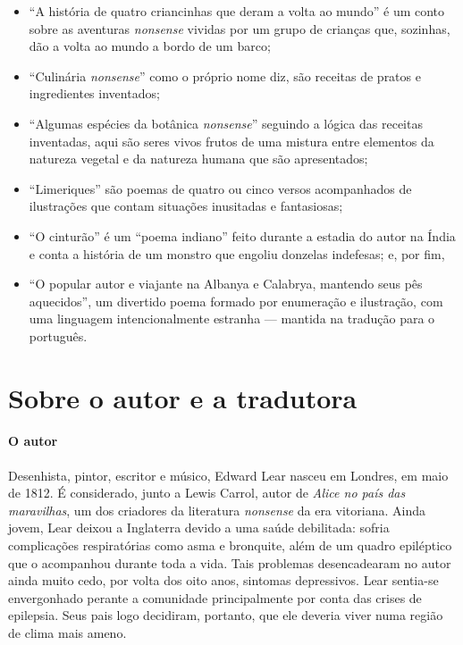 \documentclass[11pt]{extarticle}
\begin{document}
\begin{itemize}
\item {``A história de quatro criancinhas que deram a volta ao mundo''} é
um conto sobre as aventuras \emph{nonsense} vividas por um grupo de crianças
que, sozinhas, dão a volta ao mundo a bordo de um barco;
\item {``Culinária \emph{nonsense}''} como o próprio nome diz, 
são receitas de pratos e ingredientes inventados; 
\item {``Algumas espécies da botânica \emph{nonsense}''} seguindo a lógica das receitas inventadas,
aqui são seres vivos frutos de uma mistura entre elementos da natureza vegetal e da natureza
humana que são apresentados; 
\item {``Limeriques''} são poemas de quatro ou cinco versos acompanhados de ilustrações que contam
situações inusitadas e fantasiosas; 
\item {``O cinturão''} é um ``poema indiano'' feito durante a estadia do autor na Índia e conta a história de um 
monstro que engoliu donzelas indefesas; e, por fim,
\item {``O popular autor e viajante na Albanya e Calabrya, mantendo seus pês aquecidos''},
um divertido poema formado por enumeração e ilustração, com uma linguagem intencionalmente
estranha --- mantida na tradução para o português.
\end{itemize}


\reversemarginpar
\marginparwidth=5cm



\section{Sobre o autor e a tradutora}


\paragraph{O autor} Desenhista, pintor, escritor e músico, Edward Lear nasceu em Londres, em
maio de 1812. É considerado, junto a Lewis Carrol, autor de \textit{Alice no país das maravilhas},
um dos criadores da literatura \textit{nonsense} da era vitoriana.
Ainda jovem, Lear deixou a Inglaterra devido a uma saúde debilitada:
sofria complicações respiratórias como asma e bronquite, além
de um quadro epiléptico que o acompanhou durante toda a vida.
Tais problemas desencadearam no autor ainda muito cedo,
por volta dos oito anos, sintomas depressivos. Lear sentia-se 
envergonhado perante a comunidade principalmente por conta das
crises de epilepsia. Seus pais logo decidiram, portanto,
que ele deveria viver numa região de clima mais ameno.
\end{document}
